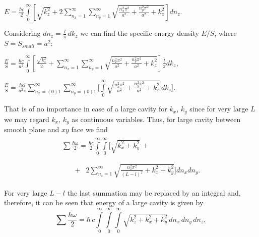 \documentclass[twoside, 10pt, ptm]{article}
\begin{document}
\begin{multicols}{2}
\noindent
\(E = \frac{\hbar c}{2}\int\limits_{0}^{\infty}\left[{\sqrt{k_z^2}+2\sum\limits_{n_x=1}^{\infty}\sum\limits_{n_y=1}^{\infty}\sqrt{\frac{n_x^2\pi^2}{a^2}+\frac{n_y^2\pi^2}{a^2}+k_z^2}}\right]d{n_z}\).

    Considering \(dn_z = \frac{l}{\pi}\,dk_z\) we can find the specific energy density \(E/S\), where
\(S = S_{small} = a^2\):

\noindent
    \(\frac{E}{S} = \frac{\hbar c}{a^2}\int\limits_{0}^{\infty}\left[{\frac{\sqrt{k_z^2}}{2}+\sum\limits_{n_x=1}^{\infty}\sum\limits_{n_y=1}^{\infty}\sqrt{\frac{n_x^2\pi^2}{a^2}+\frac{n_y^2\pi^2}{a^2}+k_z^2}}\right]\frac{l}{\pi}dk_z\),

\noindent
    \(\frac{E}{S} = \frac{\hbar c l}{a^2 \pi} \sum\limits_{n_x=(0)1}^{\infty}
\sum\limits_{n_y=(0)1}^{\infty}\Bigg[\int\limits_{0}^{\infty}\sqrt{\frac{n_x^2\pi^2}{a^2}+\frac{n_y^2\pi^2}{a^2}+k_z^2}\,dk_z\Bigg]\).

    That is of no importance in case of a large cavity for \(k_x\), \(k_y\)
since for very large \(L\) we may regard \(k_x\), \(k_y\) as
continuous variables. Thus, for large cavity between smooth plane and \(xy\) face we find
\noindent
\begin{equation}\begin{array}{l}
\begin{array}{ll}
\sum\frac{\hbar\omega}{2} = \frac{\hbar c}{2}\int\limits_{0}^{\infty}\int\limits_{0}^{\infty}\Bigg[\sqrt{k_x^2+k_y^2}\,+ & \,\\
\end{array} \\
\begin{array}{rr}
\,\,\,\,\,\,\,\,\,\,\,+ & 2\sum\limits_{n_z=1}^{\infty}\sqrt{\frac{n_z^2 \pi^2}{(L-l)^2}+k_x^2+k_y^2}\Bigg]d{n_x}d{n_y}.\end{array}
\end{array}\end{equation}


For very large \(L-l\) the last summation may be replaced by an
integral and, therefore, it can be seen that energy of a large cavity is given by
\noindent
\begin{equation}\sum\frac{\hbar\omega}{2} = \hbar\,c\int\limits_{0}^{\infty}\int\limits_{0}^{\infty}\int\limits_{0}^{\infty}\sqrt{k_z^2+k_x^2+k_y^2}\,d{n_x}\,d{n_y}\,d{n_z},\end{equation}


\end{multicols}
\end{document}
